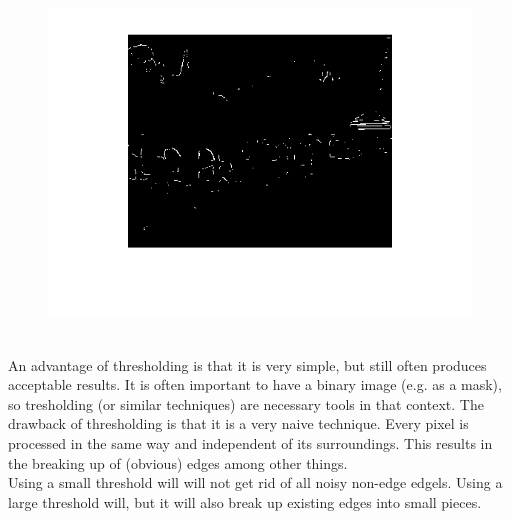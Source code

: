 \documentclass[12pt, a4paper]{article}
\begin{document}
~\\[-20mm]\begin{figure}[H]
	\centering
	\includegraphics[width=\textwidth]{fig8.png}
\end{figure}
~\\[-20mm]
An advantage of thresholding is that it is very simple, but still often produces acceptable results. It is often important to have a binary image (e.g. as a mask), so tresholding (or similar techniques) are necessary tools in that context. The drawback of thresholding is that it is a very naive technique. Every pixel is processed in the same way and independent of its surroundings. This results in the breaking up of (obvious) edges among other things.\\
Using a small threshold will will not get rid of all noisy non-edge edgels. Using a large threshold will, but it will also break up existing edges into small pieces.
\end{document}
